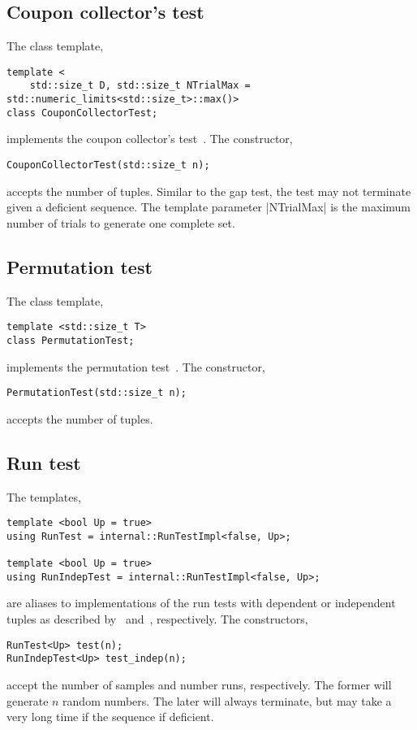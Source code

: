 \subsection{Coupon collector's test}
\label{sub:Coupon collector's test}

The class template,
\begin{Verbatim}
template <
    std::size_t D, std::size_t NTrialMax = std::numeric_limits<std::size_t>::max()>
class CouponCollectorTest;
\end{Verbatim}
implements the coupon collector's test~\cite[pp.~64]{Knuth:1997us}. The
constructor,
\begin{Verbatim}
CouponCollectorTest(std::size_t n);
\end{Verbatim}
accepts the number of tuples. Similar to the gap test, the test may not
terminate given a deficient sequence. The template parameter |NTrialMax| is the
maximum number of trials to generate one complete set.

\subsection{Permutation test}
\label{sub:Permutation test}

The class template,
\begin{Verbatim}
template <std::size_t T>
class PermutationTest;
\end{Verbatim}
implements the permutation test~\cite[pp.~65]{Knuth:1997us}. The constructor,
\begin{Verbatim}
PermutationTest(std::size_t n);
\end{Verbatim}
accepts the number of tuples.

\subsection{Run test}
\label{sub:Run test}

The templates,
\begin{Verbatim}
template <bool Up = true>
using RunTest = internal::RunTestImpl<false, Up>;

template <bool Up = true>
using RunIndepTest = internal::RunTestImpl<false, Up>;
\end{Verbatim}
are aliases to implementations of the run tests with dependent or
independent tuples as described by~\cite[pp.~66]{Knuth:1997us}
and~\cite[ex.~14, pp.~77]{Knuth:1997us}, respectively. The constructors,
\begin{Verbatim}
RunTest<Up> test(n);
RunIndepTest<Up> test_indep(n);
\end{Verbatim}
accept the number of samples and number runs, respectively. The former will
generate $n$ random numbers. The later will always terminate, but may take a
very long time if the sequence if deficient.

